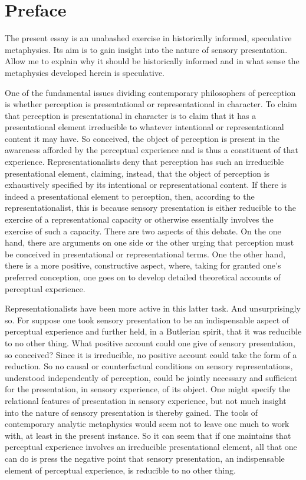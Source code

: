 \chapter*{Preface} %
\label{cha:preface}

The present essay is an unabashed exercise in historically informed, speculative metaphysics. Its aim is to gain insight into the nature of sensory presentation. Allow me to explain why it should be historically informed and in what sense the metaphysics developed herein is speculative.

One of the fundamental issues dividing contemporary philosophers of perception is whether perception is presentational or representational in character. To claim that perception is presentational in character is to claim that it has a presentational element irreducible to whatever intentional or representational content it may have. So conceived, the object of perception is present in the awareness afforded by the perceptual experience and is thus a constituent of that experience. Representationalists deny that perception has such an irreducible presentational element, claiming, instead, that the object of perception is exhaustively specified by its intentional or representational content. If there is indeed a presentational element to perception, then, according to the representationalist, this is because sensory presentation is either reducible to the exercise of a representational capacity or otherwise essentially involves the exercise of such a capacity. There are two aspects of this debate. On the one hand, there are arguments on one side or the other urging that perception must be conceived in presentational or representational terms. One the other hand, there is a more positive, constructive aspect, where, taking for granted one's preferred conception, one goes on to develop detailed theoretical accounts of perceptual experience. 

Representationalists have been more active in this latter task. And unsurprisingly so. For suppose one took sensory presentation to be an indispensable aspect of perceptual experience and further held, in a Butlerian spirit, that it was reducible to no other thing. What positive account could one give of sensory presentation, so conceived? Since it is irreducible, no positive account could take the form of a reduction. So no causal or counterfactual conditions on sensory representations, understood independently of perception, could be jointly necessary and sufficient for the presentation, in sensory experience, of its object. One might specify the relational features of presentation in sensory experience, but not much insight into the nature of sensory presentation is thereby gained. The tools of contemporary analytic metaphysics would seem not to leave one much to work with, at least in the present instance. So it can seem that if one maintains that perceptual experience involves an irreducible presentational element, all that one can do is press the negative point that sensory presentation, an indispensable element of perceptual experience, is reducible to no other thing.

